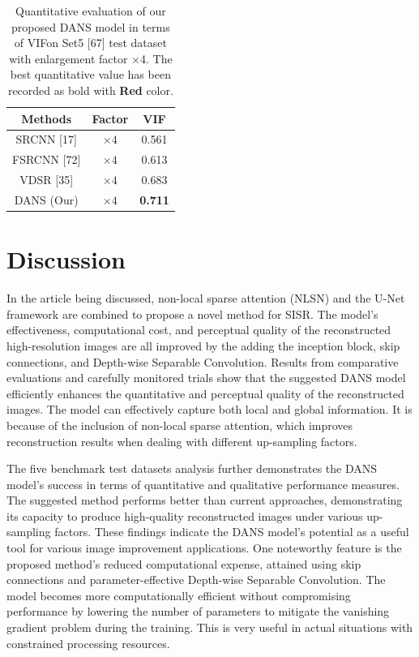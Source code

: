 \documentclass{ieeeaccess}
\begin{document}
\begin{table}[ht]
  \centering
  \caption{Quantitative evaluation of our proposed DANS model in terms of  VIFon Set5 [67] test dataset with enlargement factor $\times$4. The best quantitative value has been recorded as bold with {\color{red}\textbf{Red }} color.}

\label{table7}
\setlength{\tabcolsep}{3 pt}
  \begin{tabular}{|c|c|c|} %

    \hline

    \multirow{1}{*}{Methods} & \multirow{1}{*}{Factor} & \multirow{1}{*}{VIF}   \\

    \hline
    SRCNN [17]   & $\times4$   &{0.561}     \\
    FSRCNN [72]   & $\times4$ & {0.613} \\
    VDSR [35]   & $\times4$   & {0.683}   \\
    DANS (Our)  & $\times4$ & {\color{red}\textbf{0.711}}     \\

    \hline
  \end{tabular}
\end{table}


\section{Discussion}

In the article being discussed, non-local sparse attention (NLSN) and the U-Net framework are combined to propose a novel method for SISR. The model's effectiveness, computational cost, and perceptual quality of the reconstructed high-resolution images are all improved by the adding the inception block, skip connections, and Depth-wise Separable Convolution. Results from comparative evaluations and carefully monitored trials show that the suggested DANS model efficiently enhances the quantitative and perceptual quality of the reconstructed images. The model can effectively capture both local and global information. It is because of the inclusion of non-local sparse attention, which improves reconstruction results when dealing with different up-sampling factors. 

The five benchmark test datasets analysis further demonstrates the DANS model's success in terms of quantitative and qualitative performance measures. The suggested method performs better than current approaches, demonstrating its capacity to produce high-quality reconstructed images under various up-sampling factors. These findings indicate the DANS model's potential as a useful tool for various image improvement applications. One noteworthy feature is the proposed method's reduced computational expense, attained using skip connections and parameter-effective Depth-wise Separable Convolution. The model becomes more computationally efficient without compromising performance by lowering the number of parameters to mitigate the vanishing gradient problem during the training. This is very useful in actual situations with constrained processing resources.
\end{document}
